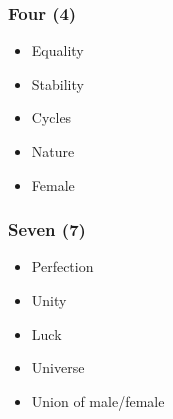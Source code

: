 \documentclass[11pt]{article}
\begin{document}
\subsubsection*{Four (4)}
\label{sec:org1391502}
\begin{itemize}
\item Equality
\item Stability
\item Cycles
\item Nature
\item Female
\end{itemize}

\subsubsection*{Seven (7)}
\label{sec:orgf3694bd}
\begin{itemize}
\item Perfection
\item Unity
\item Luck
\item Universe
\item Union of male/female
\end{itemize}
\end{document}
